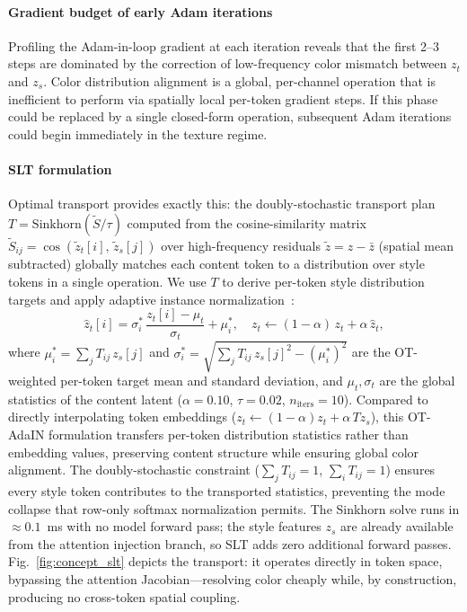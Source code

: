 \paragraph{Gradient budget of early Adam iterations}
Profiling the Adam-in-loop gradient at each iteration reveals that the first
2--3 steps are dominated by the correction of low-frequency color mismatch
between $z_t$ and $z_s$.
Color distribution alignment is a global, per-channel operation that is
inefficient to perform via spatially local per-token gradient steps.
If this phase could be replaced by a single closed-form operation,
subsequent Adam iterations could begin immediately in the texture regime.

\paragraph{SLT formulation}
Optimal transport provides exactly this: the doubly-stochastic transport plan
$T = \text{Sinkhorn}(\tilde{S}/\tau)$ computed from the cosine-similarity matrix
$\tilde{S}_{ij} = \cos(\tilde{z}_t[i],\, \tilde{z}_s[j])$
over high-frequency residuals $\tilde{z} = z - \bar{z}$ (spatial mean subtracted)
globally matches each content token to a distribution over style tokens in a single
operation.
We use $T$ to derive per-token style distribution targets and apply
adaptive instance normalization~\cite{huang2017arbitrary}:
\begin{equation}
  \hat{z}_t[i] = \sigma^*_i\,\frac{z_t[i] - \mu_t}{\sigma_t} + \mu^*_i,
  \quad
  z_t \leftarrow (1-\alpha)\,z_t + \alpha\,\hat{z}_t,
  \label{eq:slt}
\end{equation}
where $\mu^*_i = \sum_j T_{ij}\,z_s[j]$ and $\sigma^*_i = \sqrt{\sum_j T_{ij}\,z_s[j]^2 - (\mu^*_i)^2}$
are the OT-weighted per-token target mean and standard deviation,
and $\mu_t, \sigma_t$ are the global statistics of the content latent
($\alpha{=}0.10$, $\tau{=}0.02$, $n_{\mathrm{iters}}{=}10$).
Compared to directly interpolating token embeddings
($z_t \leftarrow (1-\alpha)z_t + \alpha\,Tz_s$),
this OT-AdaIN formulation transfers per-token distribution statistics rather
than embedding values, preserving content structure while ensuring
global color alignment.
The doubly-stochastic constraint
($\sum_j T_{ij}{=}1$, $\sum_i T_{ij}{=}1$)
ensures every style token contributes to the transported statistics,
preventing the mode collapse that row-only softmax normalization permits.
The Sinkhorn solve runs in $\approx 0.1$~ms with no model forward pass;
the style features $z_s$ are already available from the attention injection
branch, so SLT adds zero additional forward passes. Fig.~\ref{fig:concept_slt} depicts the transport: it operates
directly in token space, bypassing the attention Jacobian---resolving color
cheaply while, by construction, producing no cross-token spatial coupling.

